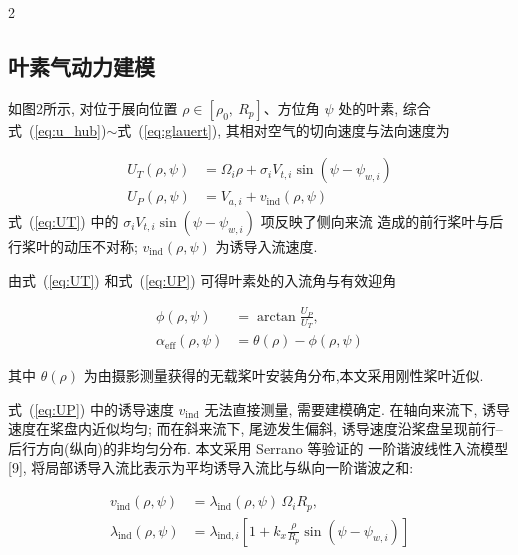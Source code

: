 \documentclass{aas}
\begin{document}
\begin{multicols}{2}%
\subsection{叶素气动力建模}
\label{subsec:rotation}
\label{subsec:blade_element}

如图2所示, 对位于展向位置 $\rho\in[\rho_0,\ R_p]$、方位角 $\psi$ 处的叶素, 综合
式~(\ref{eq:u_hub})$\sim$式~(\ref{eq:glauert}), 其相对空气的切向速度与法向速度为

\begin{align}
U_T(\rho,\psi)&=\Omega_i\rho+\sigma_i V_{t,i}\sin\!\left(\psi-\psi_{w,i}\right) \label{eq:UT}\\[2pt]
U_P(\rho,\psi)&=V_{a,i}+v_{\mathrm{ind}}(\rho,\psi) \label{eq:UP}
\end{align}
式~(\ref{eq:UT}) 中的 $\sigma_i V_{t,i}\sin(\psi-\psi_{w,i})$ 项反映了侧向来流
造成的前行桨叶与后行桨叶的动压不对称; $v_{\mathrm{ind}}(\rho,\psi)$
为诱导入流速度.

由式~(\ref{eq:UT}) 和式~(\ref{eq:UP}) 可得叶素处的入流角与有效迎角

\begin{equation}
\begin{aligned}
\phi(\rho,\psi)&=\arctan\frac{U_P}{U_T},\\
\alpha_{\mathrm{eff}}(\rho,\psi)&=\theta(\rho)-\phi(\rho,\psi)
\end{aligned}
\label{eq:aoa}
\end{equation}

其中 $\theta(\rho)$ 为由摄影测量获得的无载桨叶安装角分布,本文采用刚性桨叶近似. 

\label{subsec:induced}

式~(\ref{eq:UP}) 中的诱导速度 $v_{\mathrm{ind}}$ 无法直接测量, 需要建模确定.
在轴向来流下, 诱导速度在桨盘内近似均匀; 而在斜来流下, 尾迹发生偏斜,
诱导速度沿桨盘呈现前行--后行方向(纵向)的非均匀分布. 本文采用 Serrano 等验证的
一阶谐波线性入流模型[9], 将局部诱导入流比表示为平均诱导入流比与纵向一阶谐波之和:

\begin{equation}
\begin{aligned}
v_{\mathrm{ind}}(\rho,\psi)&=\lambda_{\mathrm{ind}}(\rho,\psi)\,\Omega_{i}R_p,\\
\lambda_{\mathrm{ind}}(\rho,\psi)&=\lambda_{\mathrm{ind},i}\left[1+k_x\frac{\rho}{R_p}\sin\!\left(\psi-\psi_{w,i}\right)\right]
\end{aligned}
\label{eq:ind_vel}
\end{equation}


\end{multicols}
\end{document}
